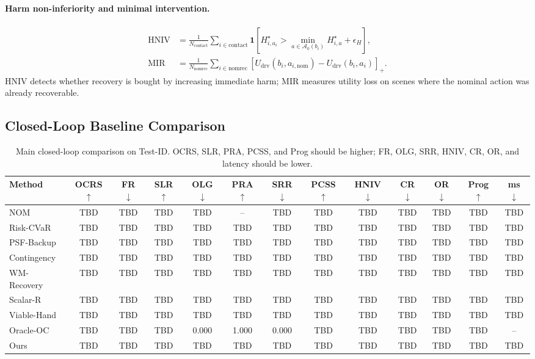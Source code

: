 \documentclass[conference]{IEEEtran}
\begin{document}
\paragraph{Harm non-inferiority and minimal intervention.}
\begin{align}
\label{eq:metric_hniv}
    \mathrm{HNIV}&=\frac{1}{N_{\mathrm{contact}}}\sum_{i\in\mathrm{contact}}
    \mathbf 1[H_{i,a_i}^{\star}>\min_{a\in\mathcal A_0(b_i)}H_{i,a}^{\star}+\epsilon_H],\\
\label{eq:metric_mir}
    \mathrm{MIR}&=\frac{1}{N_{\mathrm{nomrec}}}\sum_{i\in\mathrm{nomrec}}
    [U_{\mathrm{drv}}(b_i,a_{i,\mathrm{nom}})-U_{\mathrm{drv}}(b_i,a_i)]_+ .
\end{align}
HNIV detects whether recovery is bought by increasing immediate harm; MIR measures utility loss on scenes where the nominal action was already recoverable.

\subsection{Closed-Loop Baseline Comparison}
\label{subsec:main_results}

\begin{table}[t]
\centering
\footnotesize
\caption{Main closed-loop comparison on Test-ID.  OCRS, SLR, PRA, PCSS, and Prog should be higher; FR, OLG, SRR, HNIV, CR, OR, and latency should be lower.}
\label{tab:main_closed_loop}
\begin{tabular}{lcccccccccccc}
\toprule
Method & OCRS $\uparrow$ & FR $\downarrow$ & SLR $\uparrow$ & OLG $\downarrow$ & PRA $\uparrow$ & SRR $\downarrow$ & PCSS $\uparrow$ & HNIV $\downarrow$ & CR $\downarrow$ & OR $\downarrow$ & Prog $\uparrow$ & ms $\downarrow$ \\
\midrule
NOM & TBD & TBD & TBD & TBD & -- & TBD & TBD & TBD & TBD & TBD & TBD & TBD \\
Risk-CVaR & TBD & TBD & TBD & TBD & TBD & TBD & TBD & TBD & TBD & TBD & TBD & TBD \\
PSF-Backup & TBD & TBD & TBD & TBD & TBD & TBD & TBD & TBD & TBD & TBD & TBD & TBD \\
Contingency & TBD & TBD & TBD & TBD & TBD & TBD & TBD & TBD & TBD & TBD & TBD & TBD \\
WM-Recovery & TBD & TBD & TBD & TBD & TBD & TBD & TBD & TBD & TBD & TBD & TBD & TBD \\
Scalar-R & TBD & TBD & TBD & TBD & TBD & TBD & TBD & TBD & TBD & TBD & TBD & TBD \\
Viable-Hand & TBD & TBD & TBD & TBD & TBD & TBD & TBD & TBD & TBD & TBD & TBD & TBD \\
Oracle-OC & TBD & TBD & TBD & 0.000 & 1.000 & 0.000 & TBD & TBD & TBD & TBD & TBD & -- \\
Ours & TBD & TBD & TBD & TBD & TBD & TBD & TBD & TBD & TBD & TBD & TBD & TBD \\
\bottomrule
\end{tabular}
\end{table}
\end{document}
